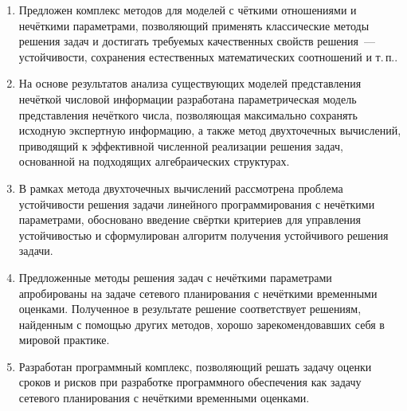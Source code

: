 \begin{enumerate}
  \item Предложен комплекс методов для моделей с чёткими отношениями и нечёткими параметрами, позволяющий применять классические методы решения задач и достигать требуемых качественных свойств решения~--- устойчивости, сохранения естественных математических соотношений и т.\,п..
  \item На основе результатов анализа существующих моделей представления нечёткой числовой информации разработана параметрическая модель представления нечёткого числа, позволяющая максимально сохранять исходную экспертную информацию, а также метод двухточечных вычислений, приводящий к эффективной численной реализации решения задач, основанной на подходящих алгебраических структурах.
  \item В рамках метода двухточечных вычислений рассмотрена проблема устойчивости решения задачи линейного программирования с нечёткими параметрами, обосновано введение свёртки критериев для управления устойчивостью и сформулирован алгоритм получения устойчивого решения задачи.
  \item Предложенные методы решения задач с нечёткими параметрами апробированы на задаче сетевого планирования с нечёткими временными оценками. Полученное в результате решение соответствует решениям, найденным с помощью других методов, хорошо зарекомендовавших себя в мировой практике.
  \item Разработан программный комплекс, позволяющий решать задачу оценки сроков и рисков при разработке программного обеспечения как задачу сетевого планирования с нечёткими временными оценками.
\end{enumerate}